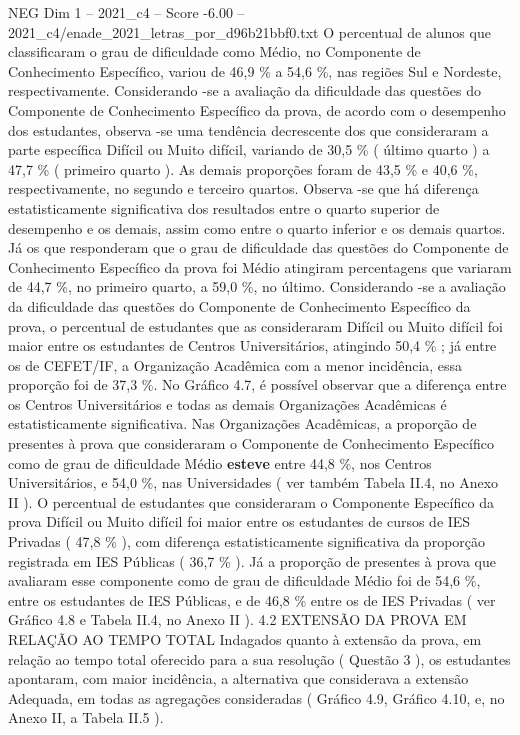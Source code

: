 \begin{textsample}{NEG Dim 1 – 2021\_c4 – Score -6.00 – 2021\_c4/enade\_2021\_letras\_por\_d96b21bbf0.txt}
O percentual de alunos que classificaram o grau de dificuldade como Médio, no Componente de Conhecimento Específico, variou de 46,9 \% a 54,6 \%, nas regiões Sul e Nordeste, respectivamente.
Considerando -se a avaliação da dificuldade das questões do Componente de Conhecimento Específico da prova, de acordo com o desempenho dos estudantes, observa -se uma tendência decrescente dos que consideraram a parte específica Difícil ou Muito difícil, variando de 30,5 \% ( último quarto ) a 47,7 \% ( primeiro quarto ).
As demais proporções foram de 43,5 \% e 40,6 \%, respectivamente, no segundo e terceiro quartos.
Observa -se que há diferença estatisticamente significativa dos resultados entre o quarto superior de desempenho e os demais, assim como entre o quarto inferior e os demais quartos.
Já os que responderam que o grau de dificuldade das questões do Componente de Conhecimento Específico da prova foi Médio atingiram percentagens que variaram de 44,7 \%, no primeiro quarto, a 59,0 \%, no último.
Considerando -se a avaliação da dificuldade das questões do Componente de Conhecimento Específico da prova, o percentual de estudantes que as consideraram Difícil ou Muito difícil foi maior entre os estudantes de Centros Universitários, atingindo 50,4 \% ; já entre os de CEFET/IF, a Organização Acadêmica com a menor incidência, essa proporção foi de 37,3 \%.
No Gráfico 4.7, é possível observar que a diferença entre os Centros Universitários e todas as demais Organizações Acadêmicas é estatisticamente significativa.
Nas Organizações Acadêmicas, a proporção de presentes à prova que consideraram o Componente de Conhecimento Específico como de grau de dificuldade Médio \textbf{esteve} entre 44,8 \%, nos Centros Universitários, e 54,0 \%, nas Universidades ( ver também Tabela II.4, no Anexo II ).
O percentual de estudantes que consideraram o Componente Específico da prova Difícil ou Muito difícil foi maior entre os estudantes de cursos de IES Privadas ( 47,8 \% ), com diferença estatisticamente significativa da proporção registrada em IES Públicas ( 36,7 \% ).
Já a proporção de presentes à prova que avaliaram esse componente como de grau de dificuldade Médio foi de 54,6 \%, entre os estudantes de IES Públicas, e de 46,8 \% entre os de IES Privadas ( ver Gráfico 4.8 e Tabela II.4, no Anexo II ). 4.2 EXTENSÃO DA PROVA EM RELAÇÃO AO TEMPO TOTAL Indagados quanto à extensão da prova, em relação ao tempo total oferecido para a sua resolução ( Questão 3 ), os estudantes apontaram, com maior incidência, a alternativa que considerava a extensão Adequada, em todas as agregações consideradas ( Gráfico 4.9, Gráfico 4.10, e, no Anexo II, a Tabela II.5 ).

\end{textsample}
